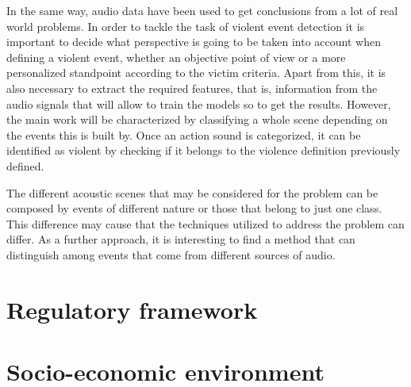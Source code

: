 	In the same way, audio data have been used to get conclusions from a lot of real world problems. In order to tackle the task of violent event detection it is important to decide what perspective is going to be taken into account when defining a violent event, whether an objective point of view or a more personalized standpoint according to the victim criteria. Apart from this, it is also necessary to extract the required features, that is, information from the audio signals that will allow to train the models so to get the results. However, the main work will be characterized by classifying a whole scene depending on the events this is built by. Once an action sound is categorized, it can be identified as violent by checking if it belongs to the violence definition previously defined.
		
	The different acoustic scenes that may be considered for the problem can be composed by events of different nature or those that belong to just one class. This difference may cause that the techniques utilized to address the problem can differ. As a further approach, it is interesting to find a method that can distinguish among events that come from different sources of audio.
	
\section{Regulatory framework}

\section{Socio-economic environment}
	
	
	
	
	
